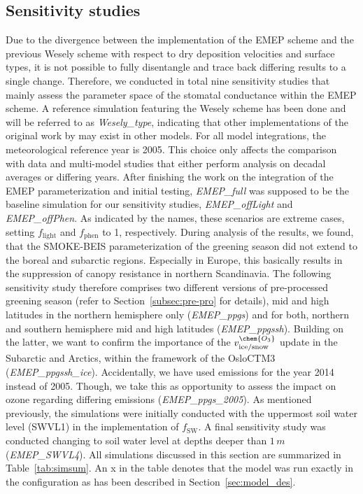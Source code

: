 \documentclass[gmd, manuscript]{copernicus}
\begin{document}
\subsection{Sensitivity studies}
\label{subsec:sens}
Due to the divergence between the implementation of the EMEP scheme and the previous Wesely scheme with respect to dry deposition velocities and surface types, it is not possible to fully disentangle and trace back differing results to a single change. Therefore, we conducted in total nine sensitivity studies that mainly assess the parameter space of the stomatal conductance within the EMEP scheme. A reference simulation featuring the Wesely scheme has been done and will be referred to as \emph{Wesely\_type}, indicating that other implementations of the original work by \citet{AE:Wesely1989} may exist in other models. For all model integrations, the meteorological reference year is 2005. This choice only affects the comparison with data and multi-model studies that either perform analysis on decadal averages or differing years. After finishing the work on the integration of the EMEP parameterization and initial testing, \emph{EMEP\_full} was supposed to be the baseline simulation for our sensitivity studies, \emph{EMEP\_offLight} and \emph{EMEP\_offPhen}. As indicated by the names, these scenarios are extreme cases, setting $f_\text{light}$ and $f_\text{phen}$ to 1, respectively. During analysis of the results, we found, that the SMOKE-BEIS parameterization of the greening season did not extend to the boreal and subarctic regions. Especially in Europe, this basically results in the suppression of canopy resistance in northern Scandinavia. The following sensitivity study therefore comprises two different versions of pre-processed greening season (refer to Section~\ref{subsec:pre-pro} for details), mid and high latitudes in the northern hemisphere only (\emph{EMEP\_ppgs}) and for both, northern and southern hemisphere mid and high latitudes (\emph{EMEP\_ppgssh}). Building on the latter, we want to confirm the importance of the $v^\chem{O_3}_\text{ice/snow}$ update \citep{ACP:Helmig2007} in the Subarctic and Arctics, within the framework of the OsloCTM3 (\emph{EMEP\_ppgssh\_ice}). Accidentally, we have used emissions for the year 2014 instead of 2005. Though, we take this as opportunity to assess the impact on ozone regarding differing emissions (\emph{EMEP\_ppgs\_2005}). As mentioned previously, the simulations were initially conducted with the uppermost soil water level (SWVL1) in the implementation of $f_\text{SW}$. A final sensitivity study was conducted changing to soil water level at depths deeper than $1\,\unit{m}$ (\emph{EMEP\_SWVL4}).
All simulations discussed in this section are summarized in Table~\ref{tab:simsum}. An x in the table denotes that the model was run exactly in the configuration as has been described in Section~\ref{sec:model_des}.
\end{document}

